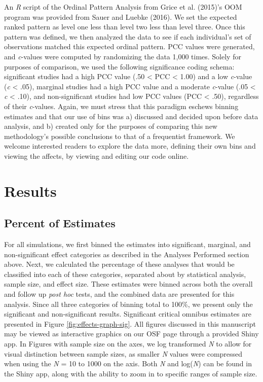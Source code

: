 \documentclass[,man, mask]{apa6}
\theoremstyle{definition}
\theoremstyle{definition}
\theoremstyle{definition}
\theoremstyle{remark}
\begin{document}
An \emph{R} script of the Ordinal Pattern Analysis from Grice et al.
(2015)'s OOM program was provided from Sauer and Luebke (2016). We set
the expected ranked pattern as level one less than level two less than
level three. Once this pattern was defined, we then analyzed the data to
see if each individual's set of observations matched this expected
ordinal pattern. PCC values were generated, and \emph{c}-values were
computed by randomizing the data 1,000 times. Solely for purposes of
comparison, we used the following significance coding schema:
significant studies had a high PCC value (.50 \textless{} PCC
\textless{} 1.00) and a low \emph{c}-value (\emph{c} \textless{} .05),
marginal studies had a high PCC value and a moderate \emph{c}-value (.05
\textless{} \emph{c} \textless{} .10), and non-significant studies had
low PCC values (PCC \textless{} .50), regardless of their
\emph{c}-values. Again, we must stress that this paradigm eschews
binning estimates and that our use of bins was a) discussed and decided
upon before data analysis, and b) created only for the purposes of
comparing this new methodology's possible conclusions to that of a
frequentist framework. We welcome interested readers to explore the data
more, defining their own bins and viewing the affects, by viewing and
editing our code online.

\section{Results}\label{results}

\subsection{Percent of Estimates}\label{percent-of-estimates}

For all simulations, we first binned the estimates into significant,
marginal, and non-significant effect categories as described in the
Analyses Performed section above. Next, we calculated the percentage of
these analyses that would be classified into each of these categories,
separated about by statistical analysis, sample size, and effect size.
These estimates were binned across both the overall and follow up
\emph{post hoc} tests, and the combined data are presented for this
analysis. Since all three categories of binning total to 100\%, we
present only the significant and non-significant results. Significant
critical omnibus estimates are presented in Figure
\ref{fig:effects-graph-sig}. All figures discussed in this manuscript
may be viewed as interactive graphics on our OSF page through a provided
Shiny app. In Figures with sample size on the axes, we log transformed
\emph{N} to allow for visual distinction between sample sizes, as
smaller \emph{N} values were compressed when using the \emph{N} = 10 to
1000 on the axis. Both \emph{N} and log(\emph{N}) can be found in the
Shiny app, along with the ability to zoom in to specific ranges of
sample size.
\end{document}
